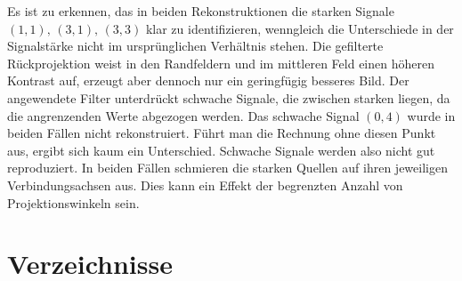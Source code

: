 \documentclass[slug=PET, room=Andreas-Schubert-Bau\,\ 424A, supervisor=Carsten\ Bittrich, coursedate=10.\ 01.\ 2020]{../../Lab_Report_LaTeX/lab_report}
\begin{document}
Es ist zu erkennen, das in beiden Rekonstruktionen die starken Signale
\((1,1),\,(3,1),\,(3,3)\) klar zu identifizieren, wenngleich die
Unterschiede in der Signalst\"arke nicht im urspr\"unglichen
Verh\"altnis stehen. Die gefilterte R\"uckprojektion weist in den
Randfeldern und im mittleren Feld einen h\"oheren Kontrast auf,
erzeugt aber dennoch nur ein geringf\"ugig besseres Bild.  Der
angewendete Filter unterdr\"uckt schwache Signale, die zwischen
starken liegen, da die angrenzenden Werte abgezogen werden.  Das
schwache Signal \((0,4)\) wurde in beiden F\"allen nicht
rekonstruiert. F\"uhrt man die Rechnung ohne diesen Punkt aus, ergibt
sich kaum ein Unterschied. Schwache Signale werden also nicht gut
reproduziert. In beiden F\"allen schmieren die starken Quellen auf
ihren jeweiligen Verbindungsachsen aus. Dies kann ein Effekt der
begrenzten Anzahl von Projektionswinkeln sein.

\newpage
\section{Verzeichnisse}
\label{sec:literatur}

\listoffigures

\listoftables

\printbibliography
\end{document}
